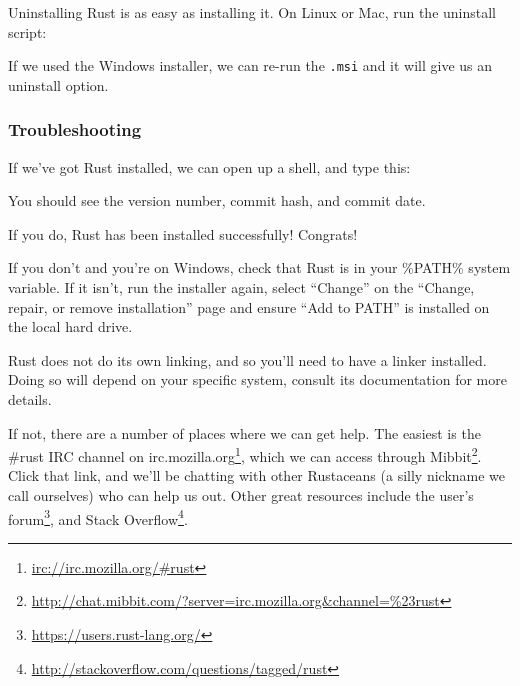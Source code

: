 \documentclass[a4paper,]{book}
\newenvironment{Shaded}{\begin{snugshade}}{\end{snugshade}}
\newcommand{\KeywordTok}[1]{\textcolor[rgb]{0.13,0.29,0.53}{\textbf{{#1}}}}
\newcommand{\NormalTok}[1]{{#1}}
\renewcommand{\href}[2]{#2\footnote{\url{#1}}}
\begin{document}
Uninstalling Rust is as easy as installing it. On Linux or Mac, run the
uninstall script:

\begin{Shaded}
\end{Shaded}

If we used the Windows installer, we can re-run the \texttt{.msi} and it
will give us an uninstall option.

\subsubsection{Troubleshooting}\label{troubleshooting}

If we've got Rust installed, we can open up a shell, and type this:

\begin{Shaded}
\end{Shaded}

You should see the version number, commit hash, and commit date.

If you do, Rust has been installed successfully! Congrats!

If you don't and you're on Windows, check that Rust is in your \%PATH\%
system variable. If it isn't, run the installer again, select ``Change''
on the ``Change, repair, or remove installation'' page and ensure ``Add
to PATH'' is installed on the local hard drive.

Rust does not do its own linking, and so you'll need to have a linker
installed. Doing so will depend on your specific system, consult its
documentation for more details.

If not, there are a number of places where we can get help. The easiest
is \href{irc://irc.mozilla.org/\#rust}{the \#rust IRC channel on
irc.mozilla.org}, which we can access through
\href{http://chat.mibbit.com/?server=irc.mozilla.org\&channel=\%23rust}{Mibbit}.
Click that link, and we'll be chatting with other Rustaceans (a silly
nickname we call ourselves) who can help us out. Other great resources
include \href{https://users.rust-lang.org/}{the user's forum}, and
\href{http://stackoverflow.com/questions/tagged/rust}{Stack Overflow}.
\end{document}
